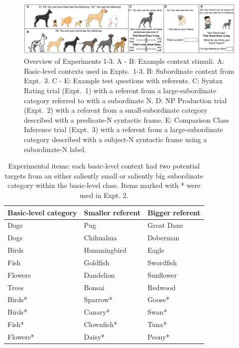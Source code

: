 \documentclass[10pt,letterpaper]{article}
\begin{document}
\begin{figure}[t]
\begin{center}
\includegraphics[width=\textwidth]{screenshots.pdf}
\end{center}
\caption{Overview of Experiments 1-3. A - B: Example context stimuli. A: Basic-level contexts used in Expts.~1-3. B: Subordinate context from Expt.~3. C - E: Example test questions with referents. C: Syntax Rating trial (Expt.~1) with a referent from a large-subordinate category referred to with a subordinate N. D: NP Production trial (Expt.~2) with a referent from a small-subordinate category described with a predicate-N syntactic frame. E: Comparison Class Inference trial (Expt.~3) with a referent from a large-subordinate category described with a subject-N syntactic frame using a subordinate-N label.} 
\label{screenshots}
\end{figure}
\begin{table}[t]
\small{
\begin{center}
\caption{Experimental items: each basic-level context had two potential targets from an either saliently small or saliently big subordinate category within the basic-level class. Items marked with * were used in Expt. 2.}
\label{tab:stimuli}
\vskip 0.12in
\fontsize{10}{11}\selectfont
\begin{tabularx}{\linewidth}{lll}
\hline
 Basic-level category & Smaller referent & Bigger referent\\
\hline
 Dogs & Pug & Great Dane \\
 Dogs & Chihuahua & Doberman\\
 Birds & Hummingbird & Eagle  \\
 Fish & Goldfish & Swordfish \\
 Flowers & Dandelion & Sunflower\\
 Trees & Bonsai & Redwood\\
Birds* & Sparrow* & Goose* \\
Birds* & Canary* & Swan* \\
Fish* & Clownfish* & Tuna* \\
Flowers* & Daisy* & Peony* \\
\hline     
\end{tabularx}
\end{center}
}
\end{table}
\end{document}

